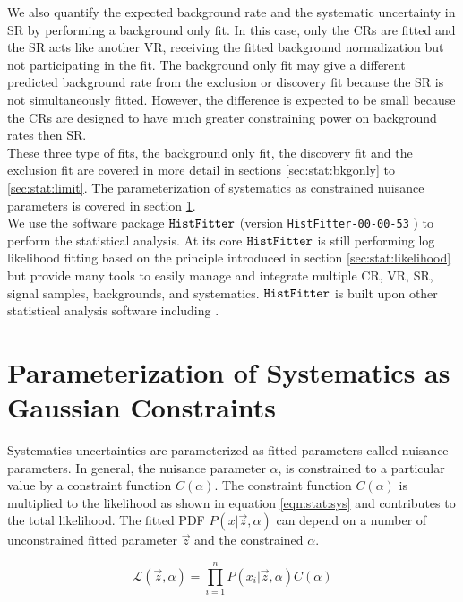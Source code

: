\indent We also quantify the expected background rate and the systematic uncertainty in SR by performing a background only fit.  In this case, only the CRs are fitted and the SR acts like another VR, receiving the fitted background normalization but not participating in the fit.  The background only fit may give a different predicted background rate from the exclusion or discovery fit because the SR is not simultaneously fitted.  However, the difference is expected to be small because the CRs are designed to have much greater constraining power on background rates then SR.  \\

\indent These three type of fits, the background only fit, the discovery fit and the exclusion fit are covered in more detail in sections \ref{sec:stat:bkgonly} to \ref{sec:stat:limit}. The parameterization of systematics as constrained nuisance parameters is covered in section \ref{sec:stat:sys}. \\

\indent We use the software package ${\tt HistFitter}$ (version {\tt HistFitter-00-00-53} ) to perform the statistical analysis.\cite{HistFitter}  At its core ${\tt HistFitter}$ is still performing log likelihood fitting based on the principle introduced in section \ref{sec:stat:likelihood} but \HistFitter provide many tools to easily manage and integrate multiple CR, VR, SR, signal samples, backgrounds, and systematics.  ${\tt HistFitter}$ is built upon other statistical analysis software including \RooFit.\cite{RooFit}

\section{Parameterization of Systematics as Gaussian Constraints}
\label{sec:stat:sys}

\indent Systematics uncertainties are parameterized as fitted parameters called nuisance parameters.  In general, the nuisance parameter $\alpha$, is constrained to a particular value by a constraint function $C(\alpha)$.   The constraint function $C(\alpha)$ is multiplied to the likelihood as shown in equation \ref{eqn:stat:sys} and contributes to the total likelihood.  The fitted PDF $P(x|\vec{z},\alpha)$ can depend on a number of unconstrained fitted parameter $\vec{z}$ and the constrained $\alpha$.  

\begin{equation}
\label{eqn:stat:sys}
{\mathcal{L}}(\vec{z},\alpha) = {\displaystyle\prod_{i=1}^{n}} P(x_i|\vec{z},\alpha) C(\alpha)
\end{equation}

